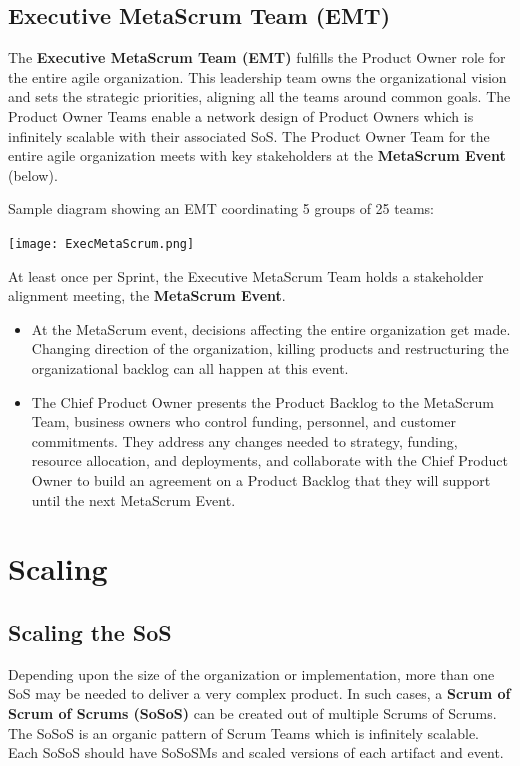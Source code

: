 \documentclass[12pt,a4paper,parskip=full]{scrartcl}
\begin{document}
\subsection{Executive MetaScrum Team (EMT)}

The \textbf{Executive MetaScrum Team (EMT)} fulfills the Product Owner role for the entire agile organization. This leadership team owns the organizational vision and sets the strategic priorities, aligning all the teams around common goals. The Product Owner Teams enable a network design of Product Owners which is infinitely scalable with their associated SoS. The Product Owner Team for the entire agile organization meets with key stakeholders at the \textbf{MetaScrum Event} (below).

Sample diagram showing an EMT coordinating 5 groups of 25 teams:

\texttt{[image: ExecMetaScrum.png]}

At least once per Sprint, the Executive MetaScrum Team holds a stakeholder alignment meeting, the \textbf{MetaScrum Event}. 

\begin{itemize}
	\item At the MetaScrum event, decisions affecting the entire organization get made. Changing direction of the organization, killing products and restructuring the organizational backlog can all happen at this event.
	\item The Chief Product Owner presents the Product Backlog to the MetaScrum Team, business owners who control funding, personnel, and customer commitments. They address any changes needed to strategy, funding, resource allocation, and deployments, and collaborate with the Chief Product Owner to build an agreement on a Product Backlog that they will support until the next MetaScrum Event.
\end{itemize}

\section{Scaling}

\subsection{Scaling the SoS}

Depending upon the size of the organization or implementation, more than one SoS may be needed to deliver a very complex product. In such cases, a \textbf{Scrum of Scrum of Scrums (SoSoS)} can be created out of multiple Scrums of Scrums. The SoSoS is an organic pattern of Scrum Teams which is infinitely scalable. Each SoSoS should have SoSoSMs and scaled versions of each artifact and event.
\end{document}
